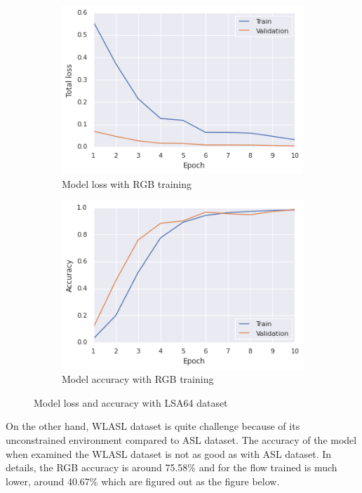 \documentclass[a4paper, 12pt]{article}
\begin{document}
\begin{figure}[H]
    \centering
    \begin{subfigure}[b]{0.4\textwidth}
        \includegraphics[width=\textwidth]{result_ASL_rgb_loss.png}
        \caption{Model loss with RGB training          }
    \end{subfigure}
    \hfill
    \begin{subfigure}[b]{0.4\textwidth}
        \includegraphics[width=\textwidth]{Result_ASL_rgb_accuracy.png}
        \caption{Model accuracy with RGB training}
    \end{subfigure}
    \caption{Model loss and accuracy with LSA64 dataset}
    \label{Model training LSA64 dataset, RGB-stream}
\end{figure}

On the other hand, WLASL dataset is quite challenge because of its unconstrained environment compared to ASL dataset. The accuracy of the model when examined the WLASL dataset is not as good as with ASL dataset. In details, the RGB accuracy is around 75.58\% and for the flow trained is much lower, around 40.67\% which are figured out as the figure below.
\end{document}
